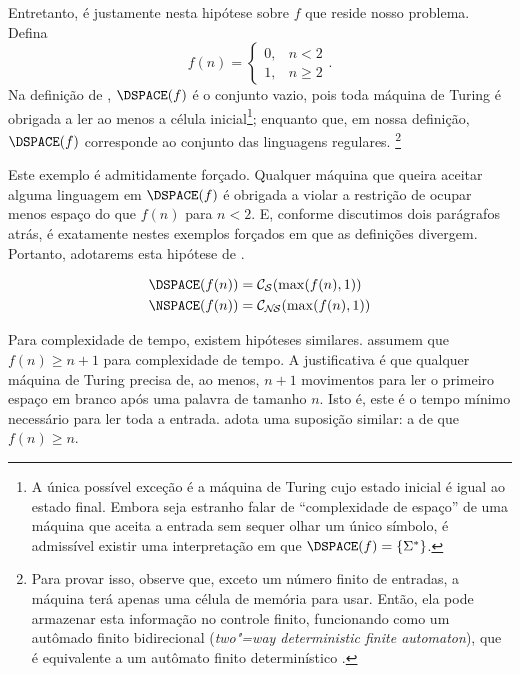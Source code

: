 Entretanto, é justamente nesta hipótese sobre $f$
que reside nosso problema. Defina
\begin{equation*}
    f(n) = \begin{cases}
        0, & n < 2 \\
        1, & n \geq 2
    \end{cases}.
\end{equation*}
Na definição de ,
$\DSPACE(f)$ é o conjunto vazio,
pois toda máquina de Turing
é obrigada a ler ao menos a célula inicial\footnote{
    A única possível exceção
    é a máquina de Turing
    cujo estado inicial é igual ao estado final.
    Embora seja estranho falar de ``complexidade de espaço''
    de uma máquina que aceita a entrada sem sequer olhar um único símbolo,
    é admissível existir uma interpretação em que
    $\DSPACE(f) = \{\Sigma^*\}$.
};
enquanto que, em nossa definição,
$\DSPACE(f)$ corresponde ao conjunto das linguagens regulares.
\footnote{
    Para provar isso, observe que,
    exceto um número finito de entradas,
    a máquina terá apenas uma célula de memória para usar.
    Então, ela pode armazenar esta informação no controle finito,
    funcionando como um autômado finito bidirecional
    (\emph{two"=way deterministic finite automaton}),
    que é equivalente a um autômato finito determinístico
    \cite[p.~40]{HopcroftUllman1979}.
}

Este exemplo é admitidamente forçado.
Qualquer máquina que queira aceitar alguma linguagem em $\DSPACE(f)$
é obrigada a violar a restrição de
ocupar menos espaço do que $f(n)$
para $n < 2$.
E, conforme discutimos dois parágrafos atrás,
é exatamente nestes exemplos forçados
em que as definições divergem.
Portanto, adotarems esta hipótese de
.

\begin{definition}
    \begin{align*}
        \DSPACE(f(n)) &= \mathcal C_\PhiDS(\max(f(n), 1)) \\
        \NSPACE(f(n)) &= \mathcal C_\PhiNS(\max(f(n), 1))
    \end{align*}
\end{definition}

Para complexidade de tempo,
existem hipóteses similares.
assumem que $f(n) \geq n+1$
para complexidade de tempo.
A justificativa é que
qualquer máquina de Turing precisa de,
ao menos,
$n+1$ movimentos para ler o primeiro espaço em branco
após uma palavra de tamanho $n$.
Isto é,
este é o tempo mínimo necessário
para ler toda a entrada.
adota uma suposição similar:
a de que $f(n) \geq n$.

